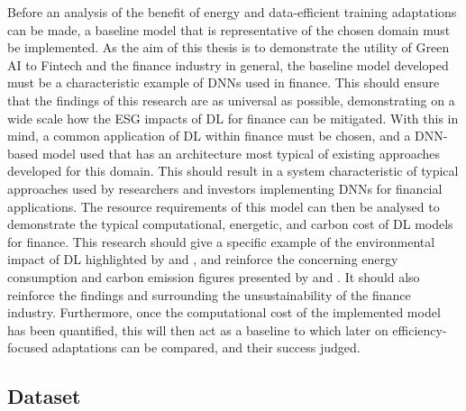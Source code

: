 \documentclass[a4paper, 11pt]{report}
\begin{document}
    Before an analysis of the benefit of energy and data-efficient training adaptations can be made, a baseline model that is representative of the chosen domain must be implemented. As the aim of this thesis is to demonstrate the utility of Green AI to Fintech and the finance industry in general, the baseline model developed must be a characteristic example of DNNs used in finance. This should ensure that the findings of this research are as universal as possible, demonstrating on a wide scale how the ESG impacts of DL for finance can be mitigated. With this in mind, a common application of DL within finance must be chosen, and a DNN-based model used that has an architecture most typical of existing approaches developed for this domain. This should result in a system characteristic of typical approaches used by researchers and investors implementing DNNs for financial applications. The resource requirements of this model can then be analysed to demonstrate the typical computational, energetic, and carbon cost of DL models for finance. This research should give a specific example of the environmental impact of DL highlighted by \citet{schwartz-2019} and \citet{strubell-2019}, and reinforce the concerning energy consumption and carbon emission figures presented by \citet{hockstad-2018} and \citet{masanet-2020}. It should also reinforce the findings \citet{greenpeace-2021} and \citet{power-2020} surrounding the unsustainability of the finance industry. Furthermore, once the computational cost of the implemented model has been quantified, this will then act as a baseline to which later on efficiency-focused adaptations can be compared, and their success judged.


    \subsection{Dataset}
    \label{section: dataset}
\end{document}

